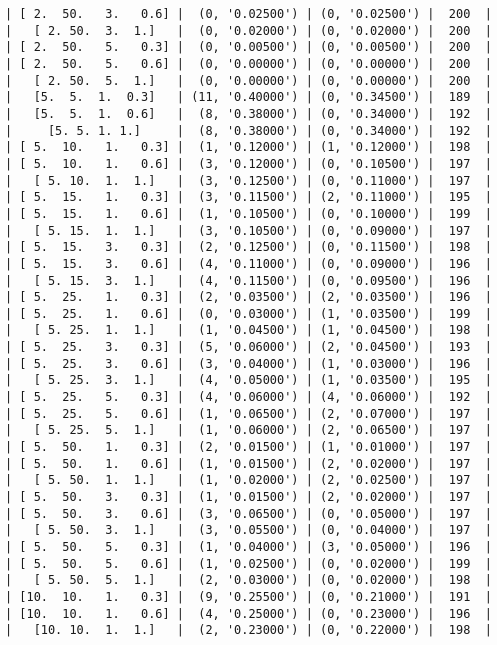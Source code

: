 \documentclass{article}
\begin{document}
\begin{verbatim}
| [ 2.  50.   3.   0.6] |  (0, '0.02500') | (0, '0.02500') |  200  |
|   [ 2. 50.  3.  1.]   |  (0, '0.02000') | (0, '0.02000') |  200  |
| [ 2.  50.   5.   0.3] |  (0, '0.00500') | (0, '0.00500') |  200  |
| [ 2.  50.   5.   0.6] |  (0, '0.00000') | (0, '0.00000') |  200  |
|   [ 2. 50.  5.  1.]   |  (0, '0.00000') | (0, '0.00000') |  200  |
|   [5.  5.  1.  0.3]   | (11, '0.40000') | (0, '0.34500') |  189  |
|   [5.  5.  1.  0.6]   |  (8, '0.38000') | (0, '0.34000') |  192  |
|     [5. 5. 1. 1.]     |  (8, '0.38000') | (0, '0.34000') |  192  |
| [ 5.  10.   1.   0.3] |  (1, '0.12000') | (1, '0.12000') |  198  |
| [ 5.  10.   1.   0.6] |  (3, '0.12000') | (0, '0.10500') |  197  |
|   [ 5. 10.  1.  1.]   |  (3, '0.12500') | (0, '0.11000') |  197  |
| [ 5.  15.   1.   0.3] |  (3, '0.11500') | (2, '0.11000') |  195  |
| [ 5.  15.   1.   0.6] |  (1, '0.10500') | (0, '0.10000') |  199  |
|   [ 5. 15.  1.  1.]   |  (3, '0.10500') | (0, '0.09000') |  197  |
| [ 5.  15.   3.   0.3] |  (2, '0.12500') | (0, '0.11500') |  198  |
| [ 5.  15.   3.   0.6] |  (4, '0.11000') | (0, '0.09000') |  196  |
|   [ 5. 15.  3.  1.]   |  (4, '0.11500') | (0, '0.09500') |  196  |
| [ 5.  25.   1.   0.3] |  (2, '0.03500') | (2, '0.03500') |  196  |
| [ 5.  25.   1.   0.6] |  (0, '0.03000') | (1, '0.03500') |  199  |
|   [ 5. 25.  1.  1.]   |  (1, '0.04500') | (1, '0.04500') |  198  |
| [ 5.  25.   3.   0.3] |  (5, '0.06000') | (2, '0.04500') |  193  |
| [ 5.  25.   3.   0.6] |  (3, '0.04000') | (1, '0.03000') |  196  |
|   [ 5. 25.  3.  1.]   |  (4, '0.05000') | (1, '0.03500') |  195  |
| [ 5.  25.   5.   0.3] |  (4, '0.06000') | (4, '0.06000') |  192  |
| [ 5.  25.   5.   0.6] |  (1, '0.06500') | (2, '0.07000') |  197  |
|   [ 5. 25.  5.  1.]   |  (1, '0.06000') | (2, '0.06500') |  197  |
| [ 5.  50.   1.   0.3] |  (2, '0.01500') | (1, '0.01000') |  197  |
| [ 5.  50.   1.   0.6] |  (1, '0.01500') | (2, '0.02000') |  197  |
|   [ 5. 50.  1.  1.]   |  (1, '0.02000') | (2, '0.02500') |  197  |
| [ 5.  50.   3.   0.3] |  (1, '0.01500') | (2, '0.02000') |  197  |
| [ 5.  50.   3.   0.6] |  (3, '0.06500') | (0, '0.05000') |  197  |
|   [ 5. 50.  3.  1.]   |  (3, '0.05500') | (0, '0.04000') |  197  |
| [ 5.  50.   5.   0.3] |  (1, '0.04000') | (3, '0.05000') |  196  |
| [ 5.  50.   5.   0.6] |  (1, '0.02500') | (0, '0.02000') |  199  |
|   [ 5. 50.  5.  1.]   |  (2, '0.03000') | (0, '0.02000') |  198  |
| [10.  10.   1.   0.3] |  (9, '0.25500') | (0, '0.21000') |  191  |
| [10.  10.   1.   0.6] |  (4, '0.25000') | (0, '0.23000') |  196  |
|   [10. 10.  1.  1.]   |  (2, '0.23000') | (0, '0.22000') |  198  |

\end{verbatim}
\end{document}
